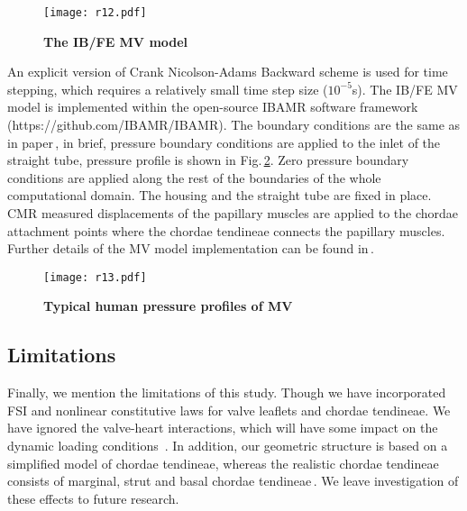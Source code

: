 \documentclass[fleqn,10pt]{wlscirep}
\begin{document}
\begin{figure}[!h]
	\centering
	\texttt{[image: r12.pdf]}
	\caption{\bf The IB/FE MV model}
	\label{M1}
\end{figure}

An explicit version of Crank Nicolson-Adams Backward scheme is used for time stepping, which requires a relatively small time step size ($10^{-5}$s). The IB/FE MV model  is implemented within the open-source IBAMR software framework (https://github.com/IBAMR/IBAMR). The boundary conditions are the same as in paper\,\cite{Hao2014A}, in brief, pressure boundary conditions are applied to the inlet of the straight tube, pressure profile is shown in Fig.\,\ref{PP}.  Zero pressure boundary conditions are applied along the rest of the boundaries of the whole computational domain. The housing and the straight tube are fixed in place. CMR measured displacements of the papillary muscles are applied to the chordae attachment points where the chordae tendineae connects the papillary muscles. Further details of the MV model implementation can be found in\,\cite{Hao2014A}.

\begin{figure}[!hpt]
	\centering
	\texttt{[image: r13.pdf]}
	\caption{\bf Typical human pressure profiles of MV}
	\label{PP}
\end{figure}

\subsection*{Limitations} Finally, we mention the limitations of this study.  Though we have incorporated FSI and nonlinear constitutive laws for valve leaflets and chordae tendineae.  We have ignored the valve-heart interactions, which will have some impact on the dynamic loading conditions \,\cite{Gao2017A}.  In addition,  our geometric structure is based on a simplified model of chordae tendineae, whereas the realistic chordae tendineae consists of  marginal, strut and basal chordae tendineae\,\cite{Toma2016Fluid}.    We leave investigation of these effects to future research. 

\end{document}
